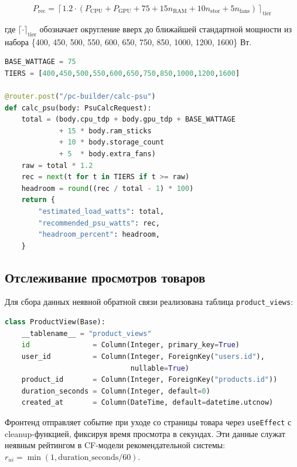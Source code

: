 \documentclass[14pt,a4paper]{extreport}
\begin{document}
\begin{equation}
  P_\text{rec} = \left\lceil 1.2 \cdot (P_\text{CPU} + P_\text{GPU} + 75 + 15 n_\text{RAM} + 10 n_\text{stor} + 5 n_\text{fans}) \right\rceil_\text{tier}
\end{equation}

где $\lceil \cdot \rceil_\text{tier}$ обозначает округление вверх до ближайшей стандартной мощности из набора \{400, 450, 500, 550, 600, 650, 750, 850, 1000, 1200, 1600\} Вт.

\begin{lstlisting}[language=Python, caption={Расчёт мощности БП (pc\_builder.py)}]
BASE_WATTAGE = 75
TIERS = [400,450,500,550,600,650,750,850,1000,1200,1600]

@router.post("/pc-builder/calc-psu")
def calc_psu(body: PsuCalcRequest):
    total = (body.cpu_tdp + body.gpu_tdp + BASE_WATTAGE
             + 15 * body.ram_sticks
             + 10 * body.storage_count
             + 5  * body.extra_fans)
    raw = total * 1.2
    rec = next(t for t in TIERS if t >= raw)
    headroom = round((rec / total - 1) * 100)
    return {
        "estimated_load_watts": total,
        "recommended_psu_watts": rec,
        "headroom_percent": headroom,
    }
\end{lstlisting}

\subsection{Отслеживание просмотров товаров}

Для сбора данных неявной обратной связи реализована таблица \texttt{product\_views}:

\begin{lstlisting}[language=Python, caption={Модель ProductView (models.py)}]
class ProductView(Base):
    __tablename__ = "product_views"
    id               = Column(Integer, primary_key=True)
    user_id          = Column(Integer, ForeignKey("users.id"),
                              nullable=True)
    product_id       = Column(Integer, ForeignKey("products.id"))
    duration_seconds = Column(Integer, default=0)
    created_at       = Column(DateTime, default=datetime.utcnow)
\end{lstlisting}

Фронтенд отправляет событие при уходе со страницы товара через \texttt{useEffect} с cleanup-функцией, фиксируя время просмотра в секундах. Эти данные служат неявным рейтингом в CF-модели рекомендательной системы: $r_{ui} = \min(1, \text{duration\_seconds} / 60)$.
\end{document}
